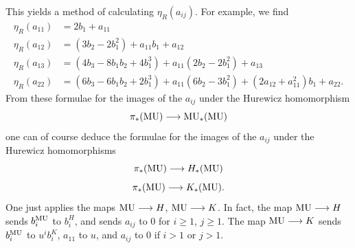 \documentclass[../main]{subfiles}
\begin{document}
This yields a method of calculating $\eta_R(a_{ij})$. For example, we find
\begin{align*}
    \eta_R(a_{11})&=2b_1+a_{11} \\ 
    \eta_R(a_{12})&=(3b_2-2b_1^2)+a_{11}b_1 + a_{12 } \\
    \eta_R(a_{13})&=(4b_3-8b_1b_2+4b_1^3)+a_{11}(2b_2-2b_1^2) + a_{13} \\ 
    \eta_R(a_{22})&=(6b_3-6b_1b_2+2b_1^3)+a_{11}(6b_2-3b_1^2) + (2a_{12}+a_{11}^2)b_1+a_{22}. 
\end{align*}
From these formulae for the images of the $a_{ij}$ under the Hurewicz homomorphism
\[\pi_\ast(\mathrm{MU})\longrightarrow \mathrm{MU}_{\ast}(\mathrm{MU})\]
one can of course deduce the formulae for the images of the $a_{ij}$ under the Hurewicz homomorphisms
\[\pi_\ast(\mathrm{MU})\longrightarrow H_\ast(\mathrm{MU})\]
\[\pi_\ast(\mathrm{MU})\longrightarrow K_\ast(\mathrm{MU}).\]
One just applies the maps $\mathrm{MU}\longrightarrow H$, $\mathrm{MU}\longrightarrow K$. In fact, the map $\mathrm{MU}\longrightarrow H$ sends $b_i^{\mathrm{MU}}$ to $b_i^H$, and sends $a_{ij}$ to $0$ for $i\geq 1$, $j\geq 1$. The map $\mathrm{MU}\longrightarrow K$ sends $b_i^{\mathrm{MU}}$ to $u^ib_i^K$, $a_{11}$ to $u$, and $a_{ij}$ to $0$ if $i>1$ or $j>1$.
\end{document}
